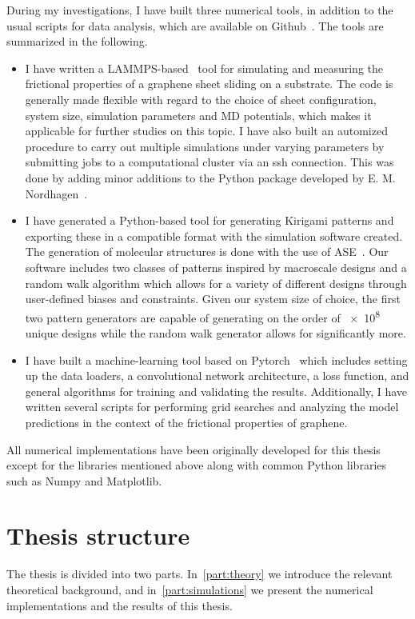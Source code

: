 During my investigations, I have built three numerical tools, in addition to the usual scripts for data analysis, which are available on
Github~\cite{Github}. The tools are summarized in the following. 
\begin{itemize}
    \item I have written a LAMMPS-based~\cite{LAMMPS} tool for simulating and
    measuring the frictional properties of a graphene sheet sliding on a
    substrate. The code is generally made flexible with regard to the choice of
    sheet configuration, system size, simulation parameters and \acrshort{MD}
    potentials, which makes it applicable for further studies on this topic.
    I have also built an automized procedure to carry out multiple simulations
    under varying parameters by submitting jobs to a computational cluster via
    an ssh connection. This was done by adding minor additions to the Python package developed by E. M. Nordhagen~\cite{lammps_simulator}.
    \item I have generated a Python-based tool for generating Kirigami patterns
    and exporting these in a compatible format with the simulation software created. The
    generation of molecular structures is done with the use of
    ASE~\cite{ase-paper}. Our software includes two classes of patterns inspired
    by macroscale designs and a random walk algorithm which allows for a variety
    of different designs through user-defined biases and constraints. Given our
    system size of choice, the first two pattern generators are capable of
    generating on the order of \num{e8} unique designs while the random walk
    generator allows for significantly more. 
    \item I have built a machine-learning tool based on
    Pytorch~\cite{NEURIPS2019_9015} which includes setting up the data loaders,
    a convolutional network architecture, a loss function, and general
    algorithms for training and validating the results. Additionally, I have
    written several scripts for performing grid searches and analyzing the model
    predictions in the context of the frictional properties of graphene. 
\end{itemize}
All numerical implementations have been originally
developed for this thesis except for the libraries mentioned above along with common Python libraries such as Numpy and
Matplotlib.

\section{Thesis structure}
The thesis is divided into two parts. In~\cref{part:theory} we introduce the
relevant theoretical background, and in~\cref{part:simulations} we present the
numerical implementations and the results of this thesis.

